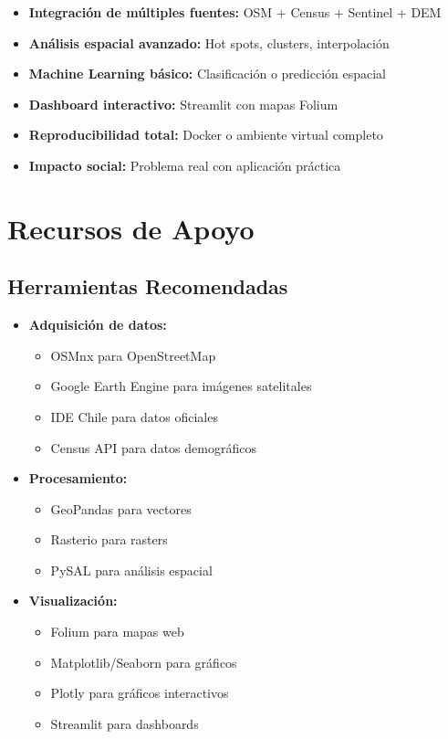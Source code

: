 \documentclass[11pt,letterpaper]{article}
\begin{document}
\begin{itemize}
    \item \textbf{Integración de múltiples fuentes:} OSM + Census + Sentinel + DEM
    \item \textbf{Análisis espacial avanzado:} Hot spots, clusters, interpolación
    \item \textbf{Machine Learning básico:} Clasificación o predicción espacial
    \item \textbf{Dashboard interactivo:} Streamlit con mapas Folium
    \item \textbf{Reproducibilidad total:} Docker o ambiente virtual completo
    \item \textbf{Impacto social:} Problema real con aplicación práctica
\end{itemize}

\section{Recursos de Apoyo}

\subsection{Herramientas Recomendadas}

\begin{itemize}
    \item \textbf{Adquisición de datos:}
    \begin{itemize}
        \item OSMnx para OpenStreetMap
        \item Google Earth Engine para imágenes satelitales
        \item IDE Chile para datos oficiales
        \item Census API para datos demográficos
    \end{itemize}

    \item \textbf{Procesamiento:}
    \begin{itemize}
        \item GeoPandas para vectores
        \item Rasterio para rasters
        \item PySAL para análisis espacial
    \end{itemize}

    \item \textbf{Visualización:}
    \begin{itemize}
        \item Folium para mapas web
        \item Matplotlib/Seaborn para gráficos
        \item Plotly para gráficos interactivos
        \item Streamlit para dashboards
    \end{itemize}
\end{itemize}
\end{document}
